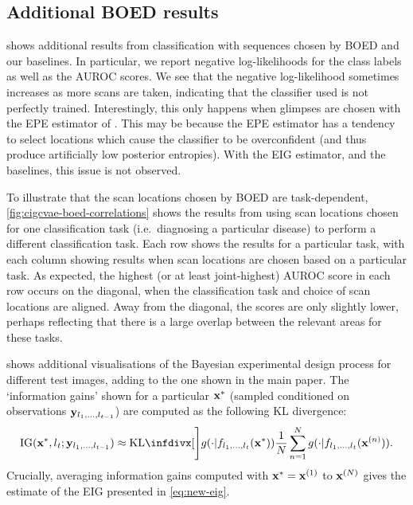 \subsection{Additional BOED results} \label{supp:cigcvae-boed-results}
 shows additional results from classification with
sequences chosen by BOED and our baselines. In particular, we report negative
log-likelihoods for the class labels as well as the AUROC scores. We see that
the negative log-likelihood sometimes increases as more scans are taken,
indicating that the classifier used is not perfectly trained. Interestingly,
this only happens when glimpses are chosen with the EPE estimator of
\citet{harvey2019near}. This may be because the EPE estimator has a tendency to
select locations which cause the classifier to be overconfident (and thus
produce artificially low posterior entropies). With the EIG estimator, and the
baselines, this issue is not observed.

To illustrate that the scan locations chosen by BOED are task-dependent,
\cref{fig:cigcvae-boed-correlations} shows the results from using scan locations chosen
for one classification task (i.e.~diagnosing a particular disease) to perform a
different classification task. Each row shows the results for a particular task,
with each column showing results when scan locations are chosen based on a
particular task. As expected, the highest (or at least joint-highest) AUROC
score in each row occurs on the diagonal, when the classification task and
choice of scan locations are aligned. Away from the diagonal, the scores are
only slightly lower, perhaps reflecting that there is a large overlap between
the relevant areas for these tasks.

 shows additional visualisations of the Bayesian
experimental design process for different test images, adding to the one shown
in the main paper. The `information gains' shown for a particular $\mathbf{x}{}^*$
(sampled conditioned on observations $\mathbf{y}{}_{l{}_1,\ldots,l{}_{t-1}}$) are
computed as the following KL divergence:
\begin{align}
  \label{eq:ig}
                                                   \text{IG}(\I{}^*, \coord{}_t; \partI{}_{\coord{}_1,\ldots,\coord{}_{t-1}}) \approx \kl[\Bigg]{g(\cdot|f_{\coord{}_1,\ldots,\coord{}_t}(\I{}^*))}{\frac{1}{N} \sum_{n=1}^N g(\cdot|f_{\coord{}_1,\ldots,\coord{}_t}(\I{}^{(n)}))}.
\end{align}
Crucially, averaging information gains computed with $\mathbf{x}{}^*=\mathbf{x}{}^{(1)}$ to
$\mathbf{x}{}^{(N)}$ gives the estimate of the EIG presented in \cref{eq:new-eig}.


